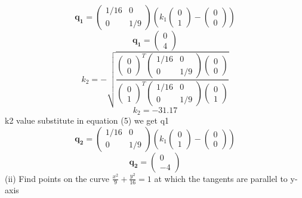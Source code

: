 \documentclass[10pt, a4paper]{article}
\newcommand{\myvec}[1]{\ensuremath{\begin{pmatrix}#1\end{pmatrix}}}
\let\vec\mathbf
\begin{document}
\begin{equation}
\vec{q_1}={\myvec{1/16&0\\0&1/9}(k_1\myvec{0\\1}-\myvec{0\\0})}
\end{equation}
\begin{equation}
\vec{q_1}=\myvec{0\\4}
\end{equation}
\begin{equation}
k_2=-\sqrt{\frac{\myvec{0\\0}^T\myvec{1/16&0\\0&1/9}\myvec{0\\0}}{\myvec{0\\1}^T\myvec{1/16&0\\0&1/9}\myvec{0\\1}}}
\end{equation}
\begin{equation}
k_2=-31.17
\end{equation}
k2 value substitute in equation (5) we get q1\\
\begin{equation}
\vec{q_2}={\myvec{1/16&0\\0&1/9}(k_1\myvec{0\\1}-\myvec{0\\0})}
\end{equation}
\begin{equation}
\vec{q_2}=\myvec{0\\-4}
\end{equation}
	(ii) Find points on the curve $\frac{x^2}{9}+\frac{y^2}{16}=1$ at which the tangents are parallel to y-axis\\
	
\end{document}
